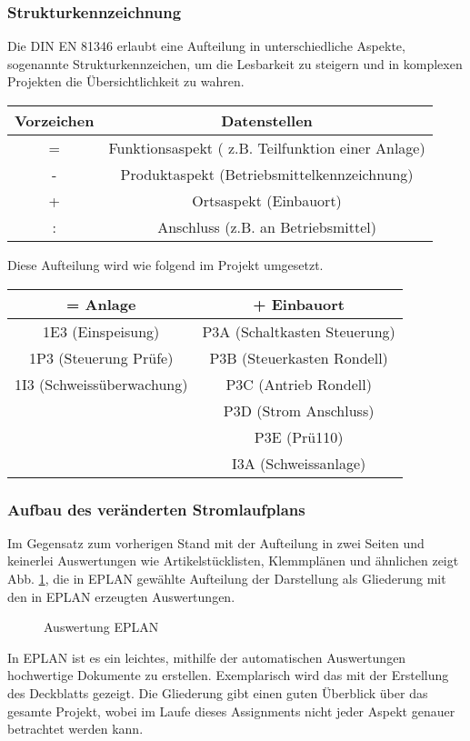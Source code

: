 \documentclass[12pt,a4paper]{scrartcl}	%
\begin{document}
\subsubsection{Strukturkennzeichnung}

Die DIN EN 81346 erlaubt eine Aufteilung in unterschiedliche Aspekte, sogenannte Strukturkennzeichen, um die Lesbarkeit zu steigern und in komplexen Projekten die Übersichtlichkeit zu wahren.\\
\begin{center}
\begin{tabular}{||c|c||}
	\hline 
	\hline
Vorzeichen	&  Datenstellen\\ 
	\hline 
=	& Funktionsaspekt ( z.B. Teilfunktion einer Anlage) \\ 
	\hline 
-	& Produktaspekt (Betriebsmittelkennzeichnung) \\ 
	\hline 
+	& Ortsaspekt (Einbauort) \\ 
	\hline 
:	& Anschluss (z.B. an Betriebsmittel) \\ 
	\hline 
\end{tabular} 
\end{center}
Diese Aufteilung wird wie folgend im Projekt umgesetzt.
\begin{center}
\begin{tabular}{||c | c||}
	\hline 
	\hline
\textbf{= Anlage}	& \textbf{+ Einbauort} \\ 
	\hline 
	\hline
1E3 (Einspeisung)	& P3A (Schaltkasten Steuerung)  \\ 
	\hline 
1P3 (Steuerung Prüfe)	& P3B (Steuerkasten Rondell)\\ 
	\hline 
1I3 (Schweissüberwachung)	& P3C (Antrieb Rondell) \\ 
	\hline 
	& P3D (Strom Anschluss) \\ 
	\hline 
	& P3E (Prü110)\\ 
	\hline 
	& I3A (Schweissanlage) \\ 
	\hline 
\end{tabular} 
\end{center}

\subsubsection{Aufbau des veränderten Stromlaufplans}
Im Gegensatz zum vorherigen Stand mit der Aufteilung in zwei Seiten und keinerlei Auswertungen wie Artikelstücklisten, Klemmplänen und ähnlichen zeigt Abb. \ref{glied}, die in EPLAN gewählte Aufteilung der Darstellung als Gliederung mit den in EPLAN erzeugten Auswertungen.
\begin{figure} [htb]
	
	\caption{Auswertung EPLAN}
	\label{glied} 
\end{figure}
In EPLAN ist es ein leichtes, mithilfe der automatischen Auswertungen hochwertige Dokumente zu erstellen. Exemplarisch wird das mit der Erstellung des Deckblatts gezeigt.
Die Gliederung gibt einen guten Überblick über das gesamte Projekt, wobei im Laufe dieses Assignments nicht jeder Aspekt genauer betrachtet werden kann.
\newpage
\end{document}
